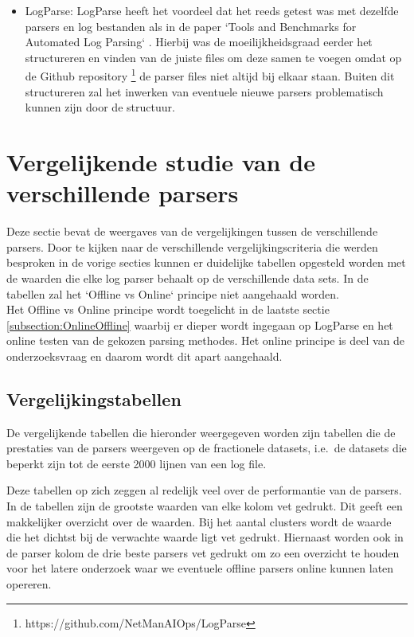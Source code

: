 \begin{itemize}
    \item LogParse: LogParse heeft het voordeel dat het reeds getest was met dezelfde parsers en log bestanden als in de paper `Tools and Benchmarks for Automated Log Parsing` \autocite{TBA2019}. Hierbij was de moeilijkheidsgraad eerder het structureren en vinden van de juiste files om deze samen te voegen omdat op de Github repository \footnote{https://github.com/NetManAIOps/LogParse} de parser files niet altijd bij elkaar staan. Buiten dit structureren zal het inwerken van eventuele nieuwe parsers problematisch kunnen zijn door de structuur.
\end{itemize}

\section{Vergelijkende studie van de verschillende parsers}
Deze sectie bevat de weergaves van de vergelijkingen tussen de verschillende parsers. Door te kijken naar de verschillende vergelijkingscriteria die werden besproken in de vorige secties kunnen er duidelijke tabellen opgesteld worden met de waarden die elke log parser behaalt op de verschillende data sets. In de tabellen zal het `Offline vs Online` principe niet aangehaald worden.\\

Het Offline vs Online principe wordt toegelicht in de laatste sectie \ref{subsection:OnlineOffline} waarbij er dieper wordt ingegaan op LogParse en het online testen van de gekozen parsing methodes. Het online principe is deel van de onderzoeksvraag en daarom wordt dit apart aangehaald.\\

\subsection{Vergelijkingstabellen}
De vergelijkende tabellen die hieronder weergegeven worden zijn tabellen die de prestaties van de parsers weergeven op de fractionele datasets, i.e.\ de datasets die beperkt zijn tot de eerste 2000 lijnen van een log file.

Deze tabellen op zich zeggen al redelijk veel over de performantie van de parsers. In de tabellen zijn de grootste waarden van elke kolom vet gedrukt. Dit geeft een makkelijker overzicht over de waarden. Bij het aantal clusters wordt de waarde die het dichtst bij de verwachte waarde ligt vet gedrukt. Hiernaast worden ook in de parser kolom de drie beste parsers vet gedrukt om zo een overzicht te houden voor het latere onderzoek waar we eventuele offline parsers online kunnen laten opereren.\\

